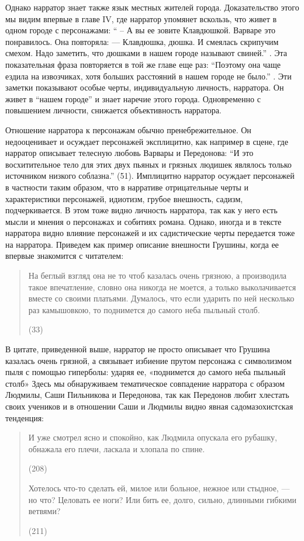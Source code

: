 \documentclass[12pt,a4paper]{article}
\begin{document}
Однако нарратор знает также язык местных жителей города. Доказательство этого мы видим впервые в главе IV, где нарратор упомянет вскользь, что живет в одном городе с персонажами: \enquote{ – А вы ее зовите Клавдюшкой.
Варваре это понравилось. Она повторяла:
— Клавдюшка, дюшка.
И смеялась скрипучим смехом. Надо заметить, что дюшками в 
нашем городе называют свиней.} \parencite[33]{sologub2004}. Эта показательная фраза повторяется в той же главе еще раз: \enquote{Поэтому она чаще ездила на извозчиках,
хотя больших расстояний в нашем городе не было.} \parencite[34]{sologub2004}. Эти заметки показывают особые черты, индивидуальную личность,  нарратора. Он живет в \enquote{нашем городе} и знает наречие этого города. Одновременно с повышением личности, снижается объективность нарратора.

Отношение нарратора к персонажам обычно пренебрежительное. Он недооценивает и осуждает персонажей эксплицитно, как например в сцене, где нарратор описывает телесную любовь Варвары и Передонова: 
\enquote{И это восхитительное тело для этих двух пьяных и грязных людишек являлось только источником низкого соблазна.} (51). 
Имплицитно нарратор осуждает персонажей в частности таким образом, что в нарративе отрицательные черты и характеристики персонажей, идиотизм, грубое внешность, садизм, подчеркивается. В этом тоже видно личность нарратора, так как у него есть мысли и мнения о персонажах и собитиях романа. Однако, иногда и в тексте нарратора видно влияние персонажей и их садистические черты передается тоже на нарратора. Приведем как пример описание внешности Грушины, когда ее впервые знакомится с читателем:

\begin{quote}
На беглый взгляд она не то
чтоб казалась очень грязною, а производила такое впечатление, словно
она никогда не моется, а только выколачивается вместе со своими 
платьями. Думалось, что если ударить по ней несколько раз камышовкою,
то поднимется до самого неба пыльный столб.

(33)
\end{quote}

В цитате, приведенной выше, нарратор не просто описывает что Грушина казалась очень грязной, а  связывает избиение прутом персонажа с символизмом пыля с помощью гиперболы: ударяя ее, «поднимется до самого неба пыльный столб» Здесь мы обнаруживаем тематическое совпадение нарратора с образом Людмилы, Саши Пильникова и Передонова, так как Передонов любит хлестать своих учеников и в отношении Саши и Людмилы видно явная садомазохистская тенденция:
\begin{quote}
И уже смотрел ясно и спокойно, как Людмила опускала его рубашку, обнажала его плечи, ласкала и хлопала по спине.

(208)

Хотелось что-то сделать ей, милое или больное, нежное или
стыдное, — но что? Целовать ее ноги? Или бить ее, долго, сильно, длинными гибкими ветвями?

(211) 
\end{quote}
\end{document}
